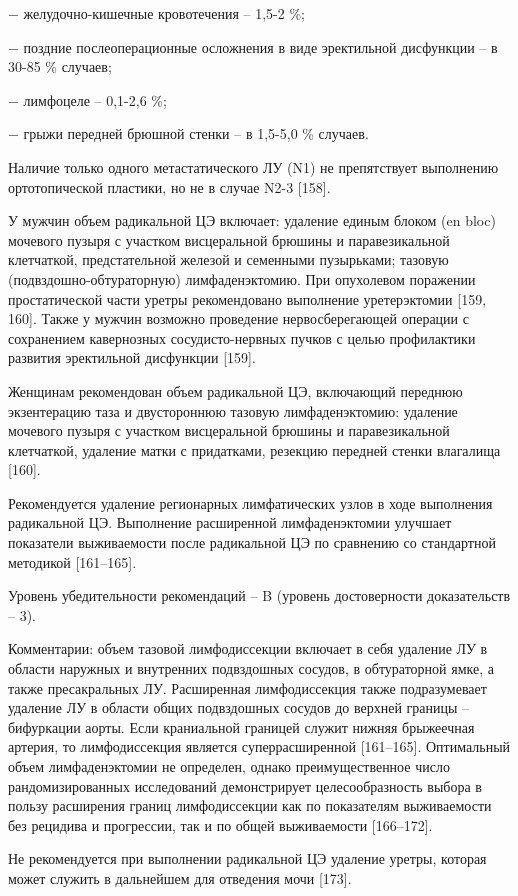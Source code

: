 − желудочно-кишечные кровотечения – 1,5-2 \%;

− поздние послеоперационные осложнения в виде эректильной дисфункции – в 30-85 \% случаев;

− лимфоцеле – 0,1-2,6 \%;

− грыжи передней брюшной стенки – в 1,5-5,0 \% случаев.

Наличие только одного метастатического ЛУ (N1) не препятствует выполнению ортотопической пластики, но не в случае N2-3 [158].

У мужчин объем радикальной ЦЭ включает: удаление единым блоком (en bloc) мочевого пузыря с участком висцеральной брюшины и паравезикальной клетчаткой, предстательной железой и семенными пузырьками; тазовую (подвздошно-обтураторную) лимфаденэктомию. При опухолевом поражении простатической части уретры рекомендовано выполнение уретерэктомии [159, 160]. Также у мужчин возможно проведение нервосберегающей операции с сохранением кавернозных сосудисто-нервных пучков с целью профилактики развития эректильной дисфункции [159].

Женщинам рекомендован объем радикальной ЦЭ, включающий переднюю экзентерацию таза и двустороннюю тазовую лимфаденэктомию: удаление мочевого пузыря с участком висцеральной брюшины и паравезикальной клетчаткой, удаление матки с придатками, резекцию передней стенки влагалища [160].

Рекомендуется удаление регионарных лимфатических узлов в ходе выполнения радикальной ЦЭ. Выполнение расширенной лимфаденэктомии улучшает показатели выживаемости после радикальной ЦЭ по сравнению со стандартной методикой [161–165].

Уровень убедительности рекомендаций – B (уровень достоверности доказательств – 3).

Комментарии: объем тазовой лимфодиссекции включает в себя удаление ЛУ в области наружных и внутренних подвздошных сосудов, в обтураторной ямке, а также пресакральных ЛУ. Расширенная лимфодиссекция также подразумевает удаление ЛУ в области общих подвздошных сосудов до верхней границы – бифуркации аорты. Если краниальной границей служит нижняя брыжеечная артерия, то лимфодиссекция является суперрасширенной [161–165]. Оптимальный объем лимфаденэктомии не определен, однако преимущественное число рандомизированных исследований демонстрирует целесообразность выбора в пользу расширения границ лимфодиссекции как по показателям выживаемости без рецидива и прогрессии, так и по общей выживаемости [166–172].

Не рекомендуется при выполнении радикальной ЦЭ удаление уретры, которая может служить в дальнейшем для отведения мочи [173].

